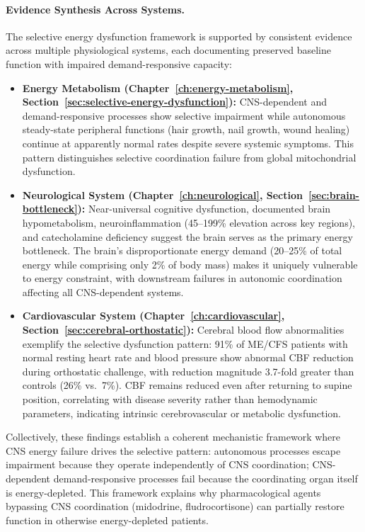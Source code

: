 \paragraph{Evidence Synthesis Across Systems.}

The selective energy dysfunction framework is supported by consistent evidence across multiple physiological systems, each documenting preserved baseline function with impaired demand-responsive capacity:

\begin{itemize}
    \item \textbf{Energy Metabolism (Chapter~\ref{ch:energy-metabolism}, Section~\ref{sec:selective-energy-dysfunction}):} CNS-dependent and demand-responsive processes show selective impairment while autonomous steady-state peripheral functions (hair growth, nail growth, wound healing) continue at apparently normal rates despite severe systemic symptoms. This pattern distinguishes selective coordination failure from global mitochondrial dysfunction.

    \item \textbf{Neurological System (Chapter~\ref{ch:neurological}, Section~\ref{sec:brain-bottleneck}):} Near-universal cognitive dysfunction, documented brain hypometabolism, neuroinflammation (45--199\% elevation across key regions), and catecholamine deficiency suggest the brain serves as the primary energy bottleneck. The brain's disproportionate energy demand (20--25\% of total energy while comprising only 2\% of body mass) makes it uniquely vulnerable to energy constraint, with downstream failures in autonomic coordination affecting all CNS-dependent systems.

    \item \textbf{Cardiovascular System (Chapter~\ref{ch:cardiovascular}, Section~\ref{sec:cerebral-orthostatic}):} Cerebral blood flow abnormalities exemplify the selective dysfunction pattern: 91\% of ME/CFS patients with normal resting heart rate and blood pressure show abnormal CBF reduction during orthostatic challenge, with reduction magnitude 3.7-fold greater than controls (26\% vs.\ 7\%). CBF remains reduced even after returning to supine position, correlating with disease severity rather than hemodynamic parameters, indicating intrinsic cerebrovascular or metabolic dysfunction.
\end{itemize}

Collectively, these findings establish a coherent mechanistic framework where CNS energy failure drives the selective pattern: autonomous processes escape impairment because they operate independently of CNS coordination; CNS-dependent demand-responsive processes fail because the coordinating organ itself is energy-depleted. This framework explains why pharmacological agents bypassing CNS coordination (midodrine, fludrocortisone) can partially restore function in otherwise energy-depleted patients.

